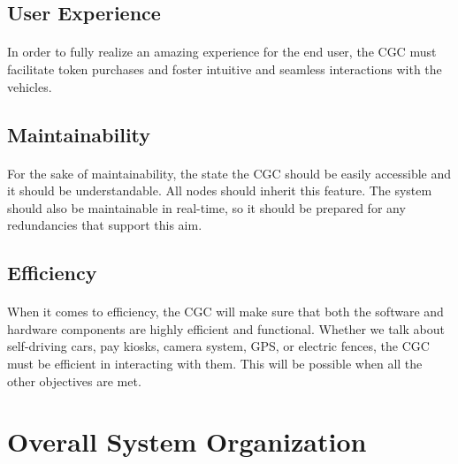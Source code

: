 \documentclass[12pt]{article}
\begin{document}
	\subsection{User Experience}\label{use}
	\paragraph{} In order to fully realize an amazing experience for the end user,
	the CGC must facilitate token purchases and foster intuitive and seamless interactions
	with the vehicles. 

	\subsection{Maintainability}\label{mai}
	\paragraph{} For the sake of maintainability, the state the CGC should be easily
	accessible and it should be understandable. All nodes should inherit this feature. 
	The system should also be maintainable in real-time, so it should be prepared for
	any redundancies that support this aim.
	
	\subsection{Efficiency}\label{eff}
	\paragraph{}When it comes to efficiency, the CGC will make sure that both 
	the software and hardware components are highly efficient and functional. 
	Whether we talk about self-driving cars, pay kiosks, camera system, GPS, 
	or electric fences, the CGC must be efficient in interacting with them. 
	This will be possible when all the other objectives are met.  



\section{Overall System Organization} 
\label{sys}
\end{document}
